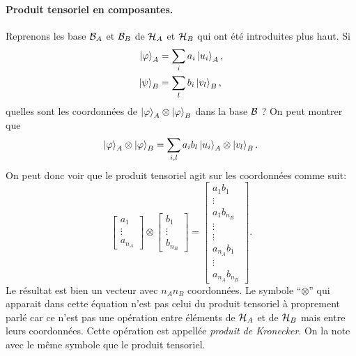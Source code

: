 \documentclass[11pt,a4paper,oneside]{article}
\begin{document}
\paragraph*{Produit tensoriel en composantes.} Reprenons les base $\mathcal{B}_A$ et $\mathcal{B}_B$ de $\mathcal{H}_A$ et $\mathcal{H}_B$ qui ont été introduites plus haut. Si
\begin{align}
    \ket{\varphi}_A &= \sum_i a_i\ket{u_i}_A,\\
    \ket{\psi}_B &= \sum_l b_i\ket{v_l}_B,
\end{align}
quelles sont les coordonnées de $\ket{\varphi}_A\otimes\ket{\varphi}_B$ dans la base $\mathcal{B}$ ? On peut montrer que
\begin{equation}
    \ket{\varphi}_A\otimes\ket{\varphi}_B = \sum_{i,l} a_ib_l\ket{u_i}_A\otimes\ket{v_l}_B.
\end{equation}
On peut donc voir que le produit tensoriel agit sur les coordonnées comme suit:
\begin{equation}
    \begin{bmatrix}
        a_1\\
        \vdots\\
        a_{n_A}
    \end{bmatrix}\otimes
    \begin{bmatrix}
        b_1\\
        \vdots\\
        b_{n_B}
    \end{bmatrix}=
    \begin{bmatrix}
        a_1b_1\\
        \vdots\\
        a_1b_{n_B}\\
        \vdots\\
        \vdots\\
        a_{n_A}b_1\\
        \vdots\\
        a_{n_A}b_{n_B}
    \end{bmatrix}.\label{eq:prodKronvecteurs}
\end{equation}
Le résultat est bien un vecteur avec $n_An_B$ coordonnées. Le symbole ``$\otimes$'' qui apparait dans cette équation n'est pas celui du produit tensoriel à proprement parlé car ce n'est pas une opération entre éléments de $\mathcal{H}_A$ et de $\mathcal{H}_B$ mais entre leurs coordonnées. Cette opération est appellée \emph{produit de Kronecker}. On la note avec le même symbole que le produit tensoriel.
\end{document}

